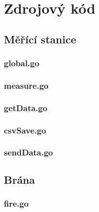 \chapter{Zdrojový kód}
\section{Měřící stanice}
\subsection{global.go}

\subsection{measure.go}

\subsection{getData.go}

\subsection{csvSave.go}

\subsection{sendData.go}

\section{Brána}
\subsection{fire.go}

